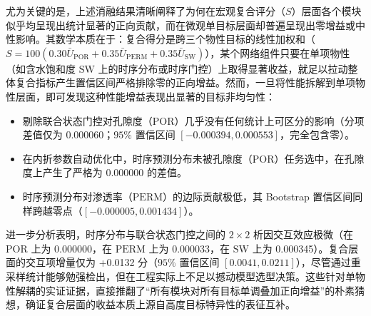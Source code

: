 \documentclass[preprint,12pt,nopreprintline]{elsarticle}
\begin{document}
\begin{table}[htbp]
\centering
\caption{受控融合单模块留一消融实验结果。各实验组均基于完全相同的冻结基学习器预测值、特征集、候选网格和内折调优。}
\label{tab:controlled-ablation}
\end{table}

尤为关键的是，上述消融结果清晰阐释了为何在宏观复合评分（$S$）层面各个模块似乎均呈现出统计显著的正向贡献，而在微观单目标层面却普遍呈现出零增益或中性影响。其数学本质在于：复合得分是跨三个物性目标的线性加权和（$S = 100(0.30\bar{U}_{\mathrm{POR}} + 0.35\bar{U}_{\mathrm{PERM}} + 0.35\bar{U}_{\mathrm{SW}})$），某个网络组件只要在单项物性（如含水饱和度 $\mathrm{SW}$ 上的时序分布或时序门控）上取得显著收益，就足以拉动整体复合指标产生置信区间严格排除零的正向增益。然而，一旦将性能拆解到单项物性层面，即可发现这种性能增益表现出显著的目标非均匀性：
\begin{itemize}
\item 剔除联合状态门控对孔隙度（$\mathrm{POR}$）几乎没有任何统计上可区分的影响（分项差值仅为 0.000060；$95\%$ 置信区间 $[-0.000394, 0.000553]$，完全包含零）。
\item 在内折参数自动优化中，时序预测分布未被孔隙度（$\mathrm{POR}$）任务选中，在孔隙度上产生了严格为 0.000000 的差值。
\item 时序预测分布对渗透率（$\mathrm{PERM}$）的边际贡献极低，其 Bootstrap 置信区间同样跨越零点（$[-0.000005, 0.001434]$）。
\end{itemize}
进一步分析表明，时序分布与联合状态门控之间的 $2 \times 2$ 析因交互效应极微（在 $\mathrm{POR}$ 上为 0.000000，在 $\mathrm{PERM}$ 上为 0.000033，在 $\mathrm{SW}$ 上为 0.000345）。复合层面的交互项增量仅为 +0.0132 分（$95\%$ 置信区间 $[0.0041, 0.0211]$），尽管通过重采样统计能够勉强检出，但在工程实际上不足以撼动模型选型决策。这些针对单物性解耦的实证证据，直接推翻了“所有模块对所有目标单调叠加正向增益”的朴素猜想，确证复合层面的收益本质上源自高度目标特异性的表征互补。
\end{document}
